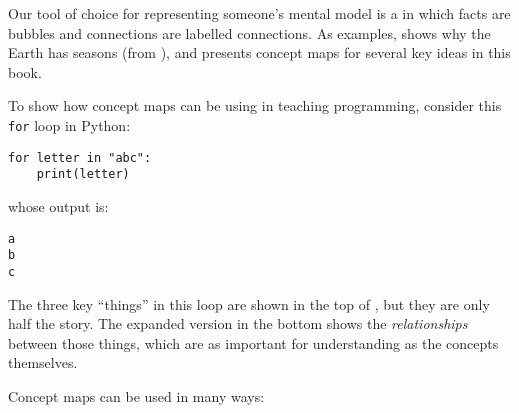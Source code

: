 
Our tool of choice for representing someone's mental model is a 
in which facts are bubbles and connections are labelled connections.
As examples,
 shows why the Earth has seasons (from ),
and  presents concept maps for several key ideas in this book.


To show how concept maps can be using in teaching programming, consider this \texttt{for} loop in Python:

\begin{verbatim}
for letter in "abc":
    print(letter)
\end{verbatim}

\noindent
whose output is:

\begin{verbatim}
a
b
c
\end{verbatim}

The three key ``things'' in this loop are shown in the top of , but they are only half the story.
The expanded version in the bottom shows the \emph{relationships} between those things,
which are as important for understanding as the concepts themselves.


\newpage
Concept maps can be used in many ways:

